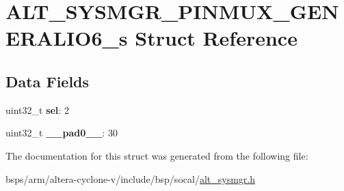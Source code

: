 \hypertarget{structALT__SYSMGR__PINMUX__GENERALIO6__s}{}\section{A\+L\+T\+\_\+\+S\+Y\+S\+M\+G\+R\+\_\+\+P\+I\+N\+M\+U\+X\+\_\+\+G\+E\+N\+E\+R\+A\+L\+I\+O6\+\_\+s Struct Reference}
\label{structALT__SYSMGR__PINMUX__GENERALIO6__s}
\subsection*{Data Fields}
\begin{DoxyCompactItemize}
\item 
\mbox{\label{structALT__SYSMGR__PINMUX__GENERALIO6__s_a7ce2385ff86401fe1bba805e5c279316}} 
uint32\+\_\+t {\bfseries sel}\+: 2
\item 
\mbox{\label{structALT__SYSMGR__PINMUX__GENERALIO6__s_a43b3235e33b3c72fe43eae38e4f5db31}} 
uint32\+\_\+t {\bfseries \+\_\+\+\_\+pad0\+\_\+\+\_\+}\+: 30
\end{DoxyCompactItemize}


The documentation for this struct was generated from the following file\+:\begin{DoxyCompactItemize}
\item 
bsps/arm/altera-\/cyclone-\/v/include/bsp/socal/\mbox{\hyperlink{alt__sysmgr_8h}{alt\+\_\+sysmgr.\+h}}\end{DoxyCompactItemize}
